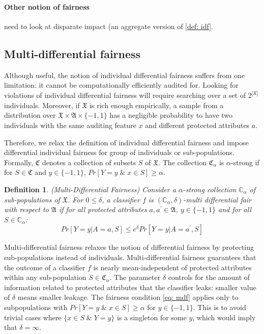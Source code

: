 \documentclass{article}
\newtheorem{defn}{Definition}[section]
\begin{document}
\paragraph{Other notion of fairness}
need to look at disparate impact (an aggregate version of \ref{def: idf}. 

\subsection{Multi-differential fairness}
Although useful, the notion of individual differential fairness suffers from one limitation: it cannot be computationally efficiently audited for. Looking for violations of individual differential fairness will require searching over a set of $2^{|\mathfrak{X}|}$ individuals. Moreover, if $\mathfrak{X}$ is rich enough empirically, a sample from a distribution over $\mathfrak{X} \times \mathfrak{A}\times \{-1, 1\}$ has a negligible probability to have two individuals with the same auditing feature $x$ and different protected attributes $a$. 

\bigskip
Therefore, we relax the definition of individual differential fairness and impose differential individual fairness for group of individuals or sub-populations. Formally, $\mathfrak{C}$ denotes a collection of subsets $S$ of $\mathfrak{X}$. The collection $\mathfrak{C}_{\alpha}$ is $\alpha$-strong if for $S\in \mathfrak{C}$ and $y\in \{-1, 1\}$, $Pr[Y=y \;\&\; x\in S] \geq \alpha$.  

\begin{defn}(Multi-Differential Fairness)
\label{def: mdf}
Consider a $\alpha$-strong collection $\mathbb{C}_{\alpha}$ of sub-populations of $\mathfrak{X}$. For $0\leq \delta$, a classifier $f$ is $(\mathbb{C}_{\alpha}, \delta)$-multi differential fair with respect to $\mathfrak{A}$ if for all protected attributes $a, a^{'}\in \mathfrak{A}$, $y\in\{-1, 1\}$ and for all $S\in \mathbb{C}_{\alpha}$:
\begin{equation}
\label{eq: mdf}
Pr[Y=y|A=a, S] \leq e^{\delta} Pr[Y=y|A=a^{'}, S]
\end{equation}
\end{defn}

Multi-differential fairness relaxes the notion of differential fairness by protecting sub-populations instead of individuals. Multi-differential fairness guarantees that the outcome of a classifier $f$ is nearly mean-independent of protected attributes within any sub-population $S\in \mathfrak{C}_{\alpha}$. The parameter $\delta$ controls for the amount of information related to protected attributes that the classifier leaks: smaller value of $\delta$ means smaller leakage. The fairness condition \ref{eq: mdf} applies only to subpopulations with $Pr[Y=y \;\&\; x\in S] \geq \alpha$ for $y\in\{-1, 1\}$. This is to avoid trivial cases where $\{x\in S \; \& \; Y=y\}$ is a singleton for some $y$, which would imply that $\delta=\infty$. 
\end{document}
